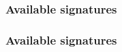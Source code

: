 \begin{frame}\frametitle{Available signatures}
\centering\myskip

\begin{minipage}{.4\textwidth}\centering
\scriptsize
\end{minipage}\begin{minipage}{.6\textwidth}\centering
\end{minipage}

\end{frame}


\begin{frame}\frametitle{Available signatures}
\centering\myskip

\begin{minipage}{.4\textwidth}\centering
\scriptsize
\end{minipage}\begin{minipage}{.6\textwidth}\centering
\end{minipage}

\end{frame}


